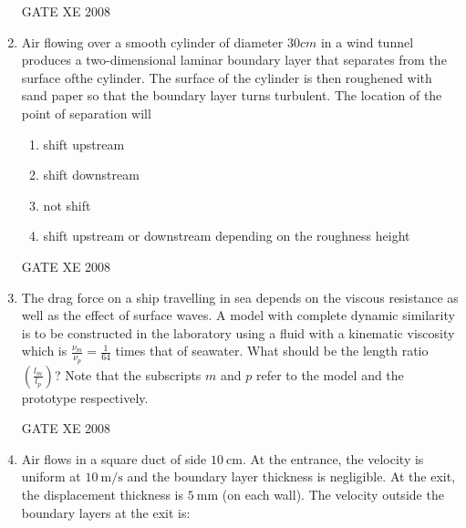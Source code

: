 \documentclass[12pt]{article}
\begin{document}
\begin{enumerate}[label=Q\arabic*.]
GATE XE 2008
\item  Air flowing over a smooth cylinder of diameter $30 cm$ in a wind tunnel produces a two-dimensional laminar boundary layer that separates from the surface ofthe cylinder. The surface of the cylinder is then roughened with sand paper so that the boundary layer turns turbulent. The location of the point of separation will

\begin{enumerate}[label=(\Alph*)]
\item  shift upstream

\item  shift downstream

\item  not shift

\item  shift upstream or downstream depending on the roughness height
\end{enumerate}

GATE XE 2008
\item The drag force on a ship travelling in sea depends on the viscous resistance as well as the effect of surface waves. A model with complete dynamic similarity is to be constructed in the laboratory using a fluid with a kinematic viscosity which is $\frac{\nu_m}{\nu_p} = \frac{1}{64}$ times that of seawater. What should be the length ratio $\left( \frac{l_m}{l_p} \right)$? Note that the subscripts $m$ and $p$ refer to the model and the prototype respectively.  

\begin{enumerate}[label=(\Alph*)]
\end{enumerate}

GATE XE 2008
\item Air flows in a square duct of side $10 \ \text{cm}$. At the entrance, the velocity is uniform at $10 \ \text{m/s}$ and the boundary layer thickness is negligible. At the exit, the displacement thickness is $5 \ \text{mm}$ (on each wall). The velocity outside the boundary layers at the exit is:

\begin{enumerate}[label=(\Alph*)]
\end{enumerate}


\end{enumerate}
\end{document}
